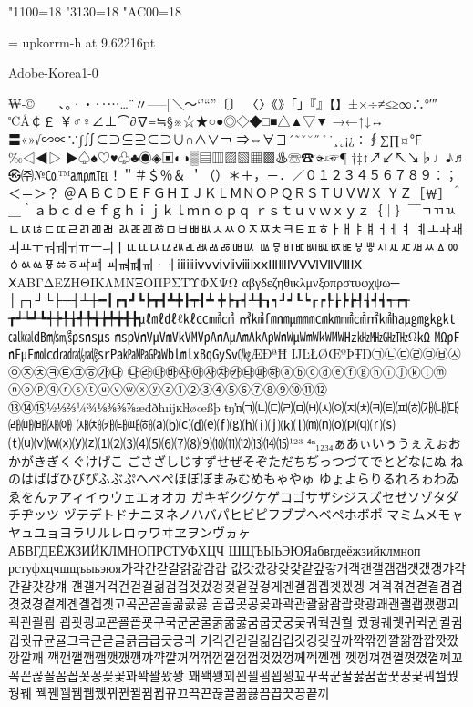 %
%
%
\kcatcode"1100=18%
\kcatcode"3130=18%
\kcatcode"AC00=18%

\font\upkorrm = upkorrm-h at 9.62216pt
\upkorrm

Adobe-Korea1-0

₩‐©ㅤ　、。·・‥⋯…¨〃–—‖＼～‘’“”〔〕
〈〉《》「」『』【】±×÷≠≤≥∞∴°′″℃Å￠￡
￥♂♀∠⊥⌒∂∇≡≒§※☆★○●◎◇◆□■△▲▽▼
→←↑↓↔〓«»√∽∝∵∫∬∈∋⊆⊇⊂⊃∪∩∧∨￢
⇒⇔∀∃´˜ˇ˘˝˚˙¸˛¡¿∶∮∑∏¤℉‰◁◀▷
▶♤♠♡♥♧♣◉◈▣◐◑▒▤▥▨▧▦▩♨☏☎☜☞¶
†‡↕↗↙↖↘♭♩♪♬㉿㈜№㏇™㏂㏘℡！＂＃＄％＆
＇（）＊＋，－．／０１２３４５６７８９：；＜＝＞？
＠ＡＢＣＤＥＦＧＨＩＪＫＬＭＮＯＰＱＲＳＴＵＶＷＸ
ＹＺ［￦］＾＿｀ａｂｃｄｅｆｇｈｉｊｋｌｍｎｏｐｑ
ｒｓｔｕｖｗｘｙｚ｛｜｝￣ㄱㄲㄳㄴㄵㄶㄷㄸㄹㄺㄻㄼ
ㄽㄾㄿㅀㅁㅂㅃㅄㅅㅆㅇㅈㅉㅊㅋㅌㅍㅎㅏㅐㅑㅒㅓㅔㅕ
ㅖㅗㅘㅙㅚㅛㅜㅝㅞㅟㅠㅡㅢㅣㅥㅦㅧㅨㅩㅪㅫㅬㅭㅮㅯ
ㅰㅱㅲㅳㅴㅵㅶㅷㅸㅹㅺㅻㅼㅽㅾㅿㆀㆁㆂㆃㆄㆅㆆㆇㆈ
ㆉㆊㆋㆌㆍㆎⅰⅱⅲⅳⅴⅵⅶⅷⅸⅹⅠⅡⅢⅣⅤⅥⅦⅧⅨ
ⅩΑΒΓΔΕΖΗΘΙΚΛΜΝΞΟΠΡΣΤΥΦΧΨΩ
αβγδεζηθικλμνξοπρστυφχψω─
│┌┐┘└├┬┤┴┼━┃┏┓┛┗┣┳┫┻╋┠┯┨┷
┿┝┰┥┸╂┒┑┚┙┖┕┎┍┞┟┡┢┦┧┩┪┭┮┱
┲┵┶┹┺┽┾╀╁╃╄╅╆╇╈╉╊㎕㎖㎗ℓ㎘㏄㎣㎤
㎥㎦㎙㎚㎛㎜㎝㎞㎟㎠㎡㎢㏊㎍㎎㎏㏏㎈㎉㏈㎧㎨㎰㎱㎲
㎳㎴㎵㎶㎷㎸㎹㎀㎁㎂㎃㎄㎺㎻㎼㎽㎾㎿㎐㎑㎒㎓㎔Ω㏀
㏁㎊㎋㎌㏖㏅㎭㎮㎯㏛㎩㎪㎫㎬㏝㏐㏓㏃㏉㏜㏆ÆÐªĦ
ĲĿŁØŒºÞŦŊ㉠㉡㉢㉣㉤㉥㉦㉧㉨㉩㉪㉫㉬㉭㉮㉯
㉰㉱㉲㉳㉴㉵㉶㉷㉸㉹㉺㉻ⓐⓑⓒⓓⓔⓕⓖⓗⓘⓙⓚⓛⓜ
ⓝⓞⓟⓠⓡⓢⓣⓤⓥⓦⓧⓨⓩ①②③④⑤⑥⑦⑧⑨⑩⑪⑫
⑬⑭⑮½⅓⅔¼¾⅛⅜⅝⅞æđðħıĳĸŀłøœßþ
ŧŋŉ㈀㈁㈂㈃㈄㈅㈆㈇㈈㈉㈊㈋㈌㈍㈎㈏㈐㈑㈒㈓㈔㈕
㈖㈗㈘㈙㈚㈛⒜⒝⒞⒟⒠⒡⒢⒣⒤⒥⒦⒧⒨⒩⒪⒫⒬⒭⒮
⒯⒰⒱⒲⒳⒴⒵⑴⑵⑶⑷⑸⑹⑺⑻⑼⑽⑾⑿⒀⒁⒂¹²³
⁴ⁿ₁₂₃₄ぁあぃいぅうぇえぉおかがきぎくぐけげこ
ごさざしじすずせぜそぞただちぢっつづてでとどなにぬ
ねのはばぱひびぴふぶぷへべぺほぼぽまみむめもゃやゅ
ゆょよらりるれろゎわゐゑをんァアィイゥウェエォオカ
ガキギクグケゲコゴサザシジスズセゼソゾタダチヂッツ
ヅテデトドナニヌネノハバパヒビピフブプヘベペホボポ
マミムメモャヤュユョヨラリルレロヮワヰヱヲンヴヵヶ
АБВГДЕЁЖЗИЙКЛМНОПРСТУФХЦЧ
ШЩЪЫЬЭЮЯабвгдеёжзийклмноп
рстуфхцчшщъыьэюя가각간갇갈갉갊감갑
값갓갔강갖갗같갚갛개객갠갤갬갭갯갰갱갸갹갼걀걋걍걔
걘걜거걱건걷걸걺검겁것겄겅겆겉겊겋게겐겔겜겝겟겠겡
겨격겪견겯결겸겹겻겼경곁계곈곌곕곗고곡곤곧골곪곬곯
곰곱곳공곶과곽관괄괆괌괍괏광괘괜괠괩괬괭괴괵괸괼굄
굅굇굉교굔굘굡굣구국군굳굴굵굶굻굼굽굿궁궂궈궉권궐
궜궝궤궷귀귁귄귈귐귑귓규균귤그극근귿글긁금급긋긍긔
기긱긴긷길긺김깁깃깅깆깊까깍깎깐깔깖깜깝깟깠깡깥깨
깩깬깰깸깹깻깼깽꺄꺅꺌꺼꺽꺾껀껄껌껍껏껐껑께껙껜껨
껫껭껴껸껼꼇꼈꼍꼐꼬꼭꼰꼲꼴꼼꼽꼿꽁꽂꽃꽈꽉꽐꽜꽝
꽤꽥꽹꾀꾄꾈꾐꾑꾕꾜꾸꾹꾼꿀꿇꿈꿉꿋꿍꿎꿔꿜꿨꿩꿰
꿱꿴꿸뀀뀁뀄뀌뀐뀔뀜뀝뀨끄끅끈끊끌끎끓끔끕끗끙끝끼
